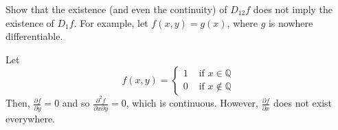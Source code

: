	\begin{exercise}[Rudin 9.26]
		Show that the existence (and even the continuity) of $D_{12}f$ does not imply the existence of $D_1f$. For example, let $f(x,y)=g(x)$, where $g$ is nowhere differentiable.
	\end{exercise}
	\begin{solution}
	  Let 
		\begin{equation}
			f(x, y) = \begin{cases} 
				1 & \text{ if } x \in \mathbb{Q} \\ 
				0 & \text{ if } x \not\in \mathbb{Q} 
			\end{cases}
		\end{equation}
		Then, $\frac{\partial f}{\partial y} = 0$ and so $\frac{\partial^2 f}{\partial x \partial y} = 0$, which is continuous. However, $\frac{\partial f}{\partial x}$ does not exist everywhere. 
	\end{solution}

